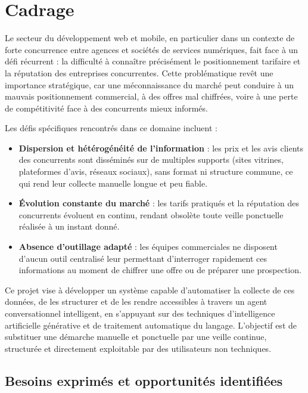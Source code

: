 \section{Cadrage}

Le secteur du développement web et mobile, en particulier dans un contexte de forte concurrence
entre agences et sociétés de services numériques, fait face à un défi récurrent : la difficulté à connaître
précisément le positionnement tarifaire et la réputation des entreprises concurrentes. Cette problématique
revêt une importance stratégique, car une méconnaissance du marché peut conduire à un mauvais
positionnement commercial, à des offres mal chiffrées, voire à une perte de compétitivité face à des
concurrents mieux informés.

Les défis spécifiques rencontrés dans ce domaine incluent :
\begin{itemize}
    \item \textbf{Dispersion et hétérogénéité de l'information} : les prix et les avis clients des concurrents
    sont disséminés sur de multiples supports (sites vitrines, plateformes d'avis, réseaux sociaux), sans
    format ni structure commune, ce qui rend leur collecte manuelle longue et peu fiable.
    \item \textbf{Évolution constante du marché} : les tarifs pratiqués et la réputation des concurrents évoluent
    en continu, rendant obsolète toute veille ponctuelle réalisée à un instant donné.
    \item \textbf{Absence d'outillage adapté} : les équipes commerciales ne disposent d'aucun outil centralisé
    leur permettant d'interroger rapidement ces informations au moment de chiffrer une offre ou de
    préparer une prospection.
\end{itemize}

Ce projet vise à développer un système capable d'automatiser la collecte de ces données, de les
structurer et de les rendre accessibles à travers un agent conversationnel intelligent, en s'appuyant sur des
techniques d'intelligence artificielle générative et de traitement automatique du langage. L'objectif est de
substituer une démarche manuelle et ponctuelle par une veille continue, structurée et directement
exploitable par des utilisateurs non techniques.

\subsection{Besoins exprimés et opportunités identifiées}

